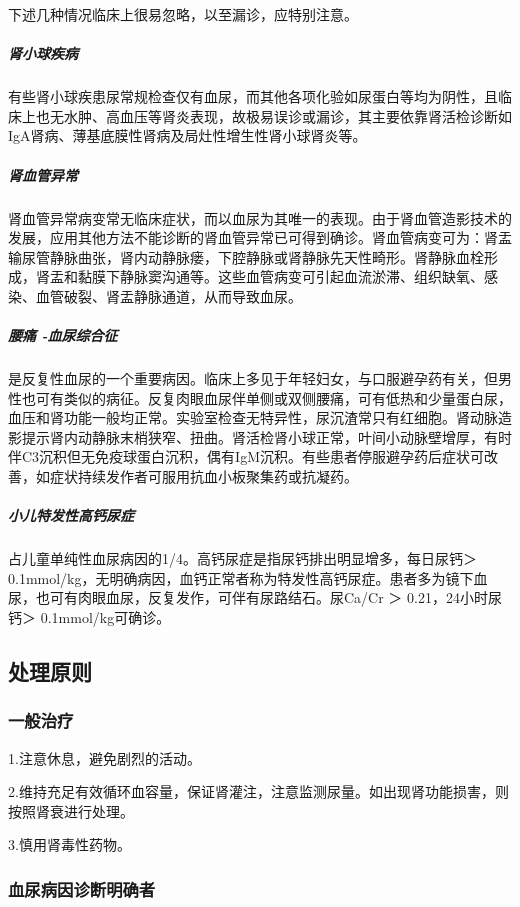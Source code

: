 下述几种情况临床上很易忽略，以至漏诊，应特别注意。

\subparagraph{肾小球疾病}

有些肾小球疾患尿常规检查仅有血尿，而其他各项化验如尿蛋白等均为阴性，且临床上也无水肿、高血压等肾炎表现，故极易误诊或漏诊，其主要依靠肾活检诊断如IgA肾病、薄基底膜性肾病及局灶性增生性肾小球肾炎等。

\subparagraph{肾血管异常}

肾血管异常病变常无临床症状，而以血尿为其唯一的表现。由于肾血管造影技术的发展，应用其他方法不能诊断的肾血管异常已可得到确诊。肾血管病变可为：肾盂输尿管静脉曲张，肾内动静脉瘘，下腔静脉或肾静脉先天性畸形。肾静脉血栓形成，肾盂和黏膜下静脉窦沟通等。这些血管病变可引起血流淤滞、组织缺氧、感染、血管破裂、肾盂静脉通道，从而导致血尿。

\subparagraph{腰痛 -血尿综合征}

是反复性血尿的一个重要病因。临床上多见于年轻妇女，与口服避孕药有关，但男性也可有类似的病征。反复肉眼血尿伴单侧或双侧腰痛，可有低热和少量蛋白尿，血压和肾功能一般均正常。实验室检查无特异性，尿沉渣常只有红细胞。肾动脉造影提示肾内动静脉末梢狭窄、扭曲。肾活检肾小球正常，叶间小动脉壁增厚，有时伴C3沉积但无免疫球蛋白沉积，偶有IgM沉积。有些患者停服避孕药后症状可改善，如症状持续发作者可服用抗血小板聚集药或抗凝药。

\subparagraph{小儿特发性高钙尿症}

占儿童单纯性血尿病因的1/4。高钙尿症是指尿钙排出明显增多，每日尿钙＞
0.1mmol/kg，无明确病因，血钙正常者称为特发性高钙尿症。患者多为镜下血尿，也可有肉眼血尿，反复发作，可伴有尿路结石。尿Ca/Cr
＞ 0.21，24小时尿钙＞ 0.1mmol/kg可确诊。

\subsection{处理原则}

\subsubsection{一般治疗}

1.注意休息，避免剧烈的活动。

2.维持充足有效循环血容量，保证肾灌注，注意监测尿量。如出现肾功能损害，则按照肾衰进行处理。

3.慎用肾毒性药物。

\subsubsection{血尿病因诊断明确者}

